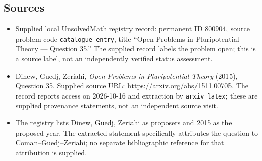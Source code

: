 \documentclass[11pt]{article}
\begin{document}
\subsection{Sources}
\begin{itemize}
\item Supplied local UnsolvedMath registry record: permanent ID \(800904\), source problem code \texttt{catalogue entry}, title ``Open Problems in Pluripotential Theory --- Question 35.'' The supplied record labels the problem open; this is a source label, not an independently verified status assessment.
\item Dinew, Guedj, Zeriahi, \emph{Open Problems in Pluripotential Theory} (2015), Question 35. Supplied source URL: \url{https://arxiv.org/abs/1511.00705}. The record reports access on 2026-10-16 and extraction by \texttt{arxiv\_latex}; these are supplied provenance statements, not an independent source visit.
\item The registry lists Dinew, Guedj, Zeriahi as proposers and 2015 as the proposed year. The extracted statement specifically attributes the question to Coman--Guedj--Zeriahi; no separate bibliographic reference for that attribution is supplied.
\end{itemize}
\end{document}
